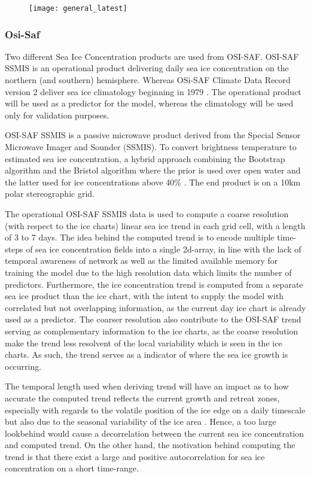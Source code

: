 \documentclass[../main/thesis.tex]{subfiles}
\begin{document}
\begin{figure}
    \texttt{[image: general\_latest]}
\end{figure}


\subsubsection{Osi-Saf}
Two different Sea Ice Concentration products are used from OSI-SAF. OSI-SAF SSMIS is an operational product delivering daily sea ice concentration on the northern (and southern) hemisphere. Whereas OSi-SAF Climate Data Record version 2 \cite{Soerensen2021} deliver sea ice climatology beginning in 1979 \cite{Lavergne2019}. The operational product will be used as a predictor for the model, whereas the climatology will be used only for validation purposes.

OSI-SAF SSMIS is a passive microwave product derived from the Special Sensor Microwave Imager and Sounder (SSMIS). To convert brightness temperature to estimated sea ice concentration, a hybrid approach combining the Bootstrap algorithm \cite{Comiso1997} and the Bristol algorithm \cite{Smith1996} where the prior is used over open water and the latter used for ice concentrations above 40\% \cite{Soerensen2021}. The end product is on a 10km polar stereographic grid.

The operational OSI-SAF SSMIS data is used to compute a coarse resolution (with respect to the ice charts) linear sea ice trend in each grid cell, with a length of 3 to 7 days. The idea behind the computed trend is to encode multiple time-steps of sea ice concentration fields into a single 2d-array, in line with the lack of temporal awareness of network  as well as the limited available memory for training the model due to the high resolution data which limits the number of predictors. Furthermore, the ice concentration trend is computed from a separate sea ice product than the ice chart, with the intent to supply the model with correlated but not overlapping information, as the current day ice chart is already used as a predictor. The coarser resolution also contribute to the OSI-SAF trend serving as complementary information to the ice charts, as the coarse resolution make the trend less resolvent of the local variability which is seen in the ice charts. As such, the trend serves as a indicator of where the sea ice growth is occurring.

The temporal length used when deriving trend will have an impact as to how accurate the computed trend reflects the current growth and retreat zones, especially with regards to the volatile position of the ice edge on a daily timescale but also due to the seasonal variability of the ice area \cite{Holand2016}. Hence, a too large lookbehind would cause a decorrelation between the current sea ice concentration and computed trend. On the other hand, the motivation behind computing the trend is that there exist a large and positive autocorrelation for sea ice concentration on a short time-range. 
\end{document}
